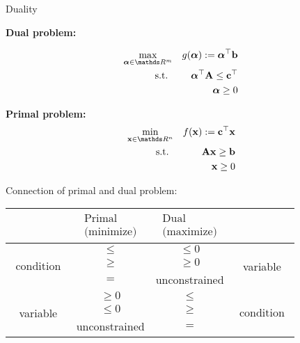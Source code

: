 \documentclass[11pt,compress,t,notes=noshow, xcolor=table]{beamer}
\begin{document}
\begin{vbframe}{Duality}

\textbf{Dual problem:}

\vspace{-\baselineskip}

\begin{eqnarray*}
    \max_{\bm{\alpha} \in \R^m} && g(\bm{\alpha}) := \bm{\alpha}^\top\mathbf{b}\\
    \text{s.t. } && \bm{\alpha}^\top\Amat \le \mathbf{c}^\top \\
    && \bm{\alpha} \ge 0
\end{eqnarray*}

\textbf{Primal problem:}
\begin{eqnarray*}
    \min_{\xv \in \R^n} && f(\xv) := \mathbf{c}^\top\xv\\
    \text{s.t. } && \Amat\xv \ge \mathbf{b} \\
    && \xv \ge 0
\end{eqnarray*}

\framebreak

Connection of primal and dual problem:

\vspace{\baselineskip}

\begin{center}
    \begin{tabular}{c||c|c||c}
        & $\begin{array}{c} \text{Primal} \\ \text{(minimize)} \end{array}$ & $\begin{array}{c} \text{Dual} \\ \text{(maximize)} \end{array}$ \\
        \hline\hline
        \multirow{3}{*}{$\begin{array}{c} \text{condition} \end{array}$} & $\le$ & $\le 0$ & \multirow{3}{*}{variable} \\
      & $\ge$ & $\ge 0$ & \\
        & $=$ & unconstrained & \\
        \hline
        \multirow{3}{*}{variable} & $\ge 0 $ & $\le$ & \multirow{3}{*}{$\begin{array}{c} \text{condition} \end{array}$}\\
        & $\le 0$ &  $\ge$ & \\
        & unconstrained & $=$ &
    \end{tabular}
\end{center}
\end{vbframe}
\end{document}
